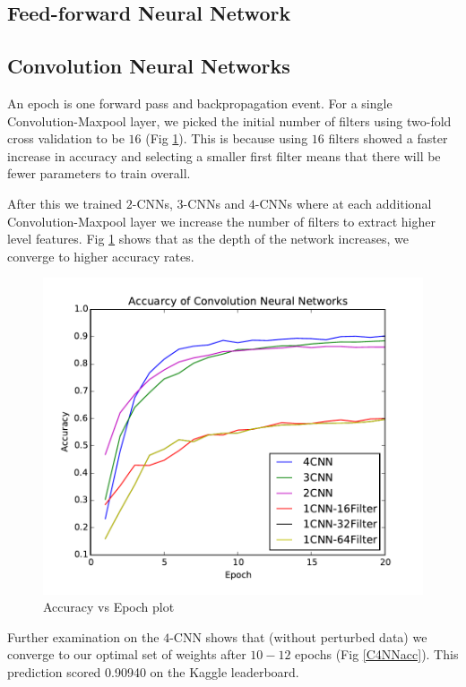 \documentclass[conference]{IEEEtran}
\begin{document}
\subsection{Feed-forward Neural Network}


\subsection{Convolution Neural Networks}
An epoch is one forward pass and backpropagation event. For a single Convolution-Maxpool layer, we picked the initial number of filters using two-fold cross validation to be $16$ (Fig \ref{CNNacc}). This is because using $16$ filters showed a faster increase in accuracy and selecting a smaller first filter means that there will be fewer parameters to train overall.

After this we trained $2$-CNNs, $3$-CNNs and $4$-CNNs where at each additional Convolution-Maxpool layer we increase the number of filters to extract higher level features. Fig \ref{CNNacc} shows that as the depth of the network increases, we converge to higher accuracy rates.

\begin{figure}[h]
	\label{CNNacc}
	\centering
	\includegraphics[scale=0.6]{CNNacc.pdf}
	\caption{Accuracy vs Epoch plot}
\end{figure}

Further examination on the $4$-CNN shows that (without perturbed data) we converge to our optimal set of weights after $10-12$ epochs (Fig \ref{C4NNacc}). This prediction scored 0.90940 on the Kaggle leaderboard.
\end{document}

